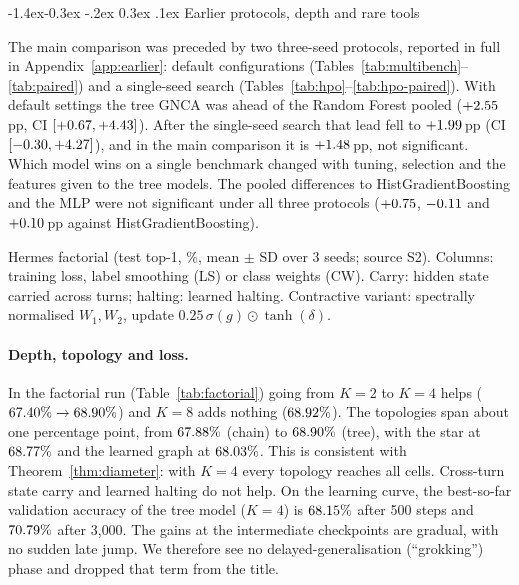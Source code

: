\documentclass[10pt,twocolumn,letterpaper]{article}
\makeatletter
\renewcommand\subsection{\@startsection{subsection}{2}{\z@}%
  {-1.4ex\@plus -0.3ex \@minus -.2ex}%
  {0.3ex \@plus .1ex}%
  {\normalfont\normalsize\bfseries}}
\makeatother
\begin{document}
\subsection{Earlier protocols, depth and rare tools}\label{sec:default-results}

The main comparison was preceded by two three-seed protocols, reported in full in Appendix~\ref{app:earlier}: default configurations (Tables~\ref{tab:multibench}--\ref{tab:paired}) and a single-seed search (Tables~\ref{tab:hpo}--\ref{tab:hpo-paired}). With default settings the tree GNCA was ahead of the Random Forest pooled ($+2.55$\,pp, CI $[+0.67, +4.43]$). After the single-seed search that lead fell to $+1.99$\,pp (CI $[-0.30, +4.27]$), and in the main comparison it is $+1.48$\,pp, not significant. Which model wins on a single benchmark changed with tuning, selection and the features given to the tree models. The pooled differences to HistGradientBoosting and the MLP were not significant under all three protocols ($+0.75$, $-0.11$ and $+0.10$\,pp against HistGradientBoosting).

\begin{table}[t]
\centering
\scriptsize
\setlength{\tabcolsep}{3pt}
\caption{Hermes factorial (test top-1, \%, mean $\pm$ SD over 3 seeds; source S2). Columns: training loss, label smoothing (LS) or class weights (CW). Carry: hidden state carried across turns; halting: learned halting. Contractive variant: spectrally normalised $W_1,W_2$, update $0.25\,\sigma(g)\odot\tanh(\delta)$.}
\label{tab:factorial}

\end{table}

\paragraph{Depth, topology and loss.} In the factorial run (Table~\ref{tab:factorial}) going from $K{=}2$ to $K{=}4$ helps ($67.40\%\to68.90\%$) and $K{=}8$ adds nothing ($68.92\%$). The topologies span about one percentage point, from $67.88\%$ (chain) to $68.90\%$ (tree), with the star at $68.77\%$ and the learned graph at $68.03\%$. This is consistent with Theorem~\ref{thm:diameter}: with $K{=}4$ every topology reaches all cells. Cross-turn state carry and learned halting do not help. On the learning curve, the best-so-far validation accuracy of the tree model ($K{=}4$) is $68.15\%$ after 500 steps and $70.79\%$ after 3{,}000. The gains at the intermediate checkpoints are gradual, with no sudden late jump. We therefore see no delayed-generalisation (``grokking'') phase and dropped that term from the title.
\end{document}
